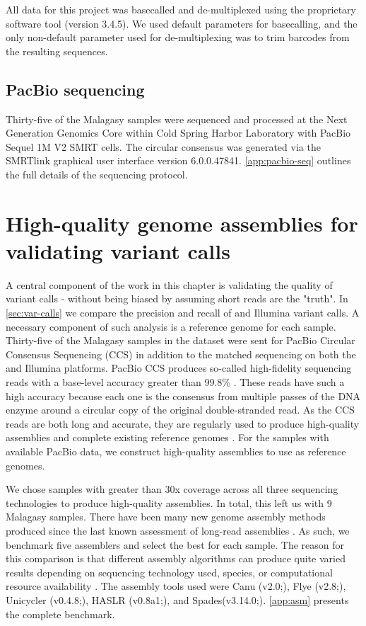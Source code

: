 All \ont{} data for this project was basecalled and de-multiplexed using the \ont{} proprietary software tool \guppy{} (version 3.4.5). We used default parameters for basecalling, and the only non-default parameter used for de-multiplexing was to trim barcodes from the resulting sequences.  

\subsection{PacBio sequencing}
Thirty-five of the Malagasy samples were sequenced and processed at the Next Generation Genomics Core within Cold Spring Harbor Laboratory with PacBio Sequel 1M V2 SMRT cells. The circular consensus was generated via the SMRTlink graphical user interface version 6.0.0.47841. \autoref{app:pacbio-seq} outlines the full details of the sequencing protocol.


\section{High-quality genome assemblies for validating variant calls}
\label{sec:asm_results}
A central component of the work in this chapter is validating the quality of variant calls - without being biased by assuming short reads are the "truth". In \autoref{sec:var-calls} we compare the precision and recall of \ont{} and Illumina variant calls. A necessary component of such analysis is a reference genome for each sample. Thirty-five of the Malagasy samples in the dataset were sent for PacBio Circular Consensus Sequencing (CCS) in addition to the matched sequencing on both the \ont{} and Illumina platforms. PacBio CCS produces so-called high-fidelity sequencing reads with a base-level accuracy greater than 99.8\% \cite{wenger2019}. These reads have such a high accuracy because each one is the consensus from multiple passes of the DNA enzyme around a circular copy of the original double-stranded read. As the CCS reads are both long and accurate, they are regularly used to produce high-quality \denovo{} assemblies and complete existing reference genomes \cite{garg2021,masonbrink2021}. For the samples with available PacBio data, we construct high-quality assemblies to use as reference genomes.

We chose samples with greater than 30x coverage across all three sequencing technologies to produce high-quality assemblies. In total, this left us with 9 Malagasy samples. There have been many new genome assembly methods produced since the last known assessment of \mtb{} long-read assemblies \cite{bainomugisa2018}. As such, we benchmark five assemblers and select the best for each sample. The reason for this comparison is that different assembly algorithms can produce quite varied results depending on sequencing technology used, species, or computational resource availability \cite{wick2020,demaio2019}. The assembly tools used were Canu (v2.0;\cite{koren2017,nurk2020}), Flye (v2.8;\cite{flye2019}), Unicycler (v0.4.8;\cite{wick2017}), HASLR (v0.8a1;\cite{haslr2020}), and Spades(v3.14.0;\cite{antipov2016}). \autoref{app:asm} presents the complete benchmark.

